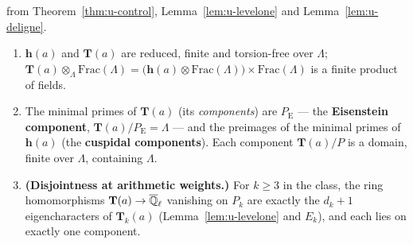 \documentclass[11pt]{article}
\newcommand{\Iw}{\Lambda}                         %
\newcommand{\hcusp}{\mathbf{h}}                   %
\newcommand{\Tu}{\mathbf{T}}                      %
\newcommand{\Pk}[1]{P_{#1}}                       %
\newcommand{\Eis}{\mathrm{E}}
\newcommand{\Qlb}{\overline{\Q}_\ell}
\begin{document}
\begin{proposition}[Components of $\Tu(a)$]\label{prop:u-components}
\PROVED{} from Theorem~\ref{thm:u-control}, Lemma~\ref{lem:u-levelone} and Lemma~\ref{lem:u-deligne}.
\begin{enumerate}
\item $\hcusp(a)$ and $\Tu(a)$ are reduced, finite and torsion-free over $\Iw$; $\Tu(a)\otimes_\Iw\mathrm{Frac}(\Iw)=
  \bigl(\hcusp(a)\otimes\mathrm{Frac}(\Iw)\bigr)\times\mathrm{Frac}(\Iw)$ is a finite product of fields.
\item The minimal primes of $\Tu(a)$ (its \emph{components}) are $P_\Eis$ --- the \textbf{Eisenstein component},
  $\Tu(a)/P_\Eis=\Iw$ --- and the preimages of the minimal primes of $\hcusp(a)$ (the \textbf{cuspidal components}). Each
  component $\Tu(a)/P$ is a domain, finite over $\Iw$, containing $\Iw$.
\item \textbf{(Disjointness at arithmetic weights.)} For $k\ge3$ in the class, the ring homomorphisms $\Tu(a)\to\Qlb$
  vanishing on $\Pk{k}$ are exactly the $d_k+1$ eigencharacters of $\Tu_k(a)$ (Lemma~\ref{lem:u-levelone} and $E_k$), and each lies
  on exactly one component.
\end{enumerate}
\end{proposition}
\end{document}

